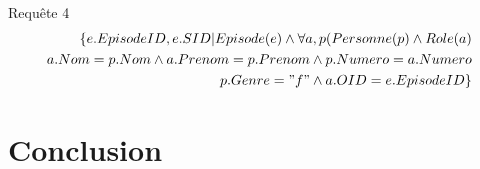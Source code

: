 \documentclass[10pt,a4paper]{article}
\begin{document}
\begin{list}{*}{}
\item Requête 4
\noindent
\[\begin{aligned}
\{e.EpisodeID, e.SID | Episode(e) \wedge \forall a, p (Personne(p) \wedge Role(a) \\
 	   a.Nom  = p.Nom \wedge a.Prenom = p.Prenom \wedge p.Numero = a.Numero \\
       p.Genre = "f" \wedge a.OID = e.EpisodeID \}
\end{aligned}\]
\end{list}
\section{Conclusion}
\end{document}
